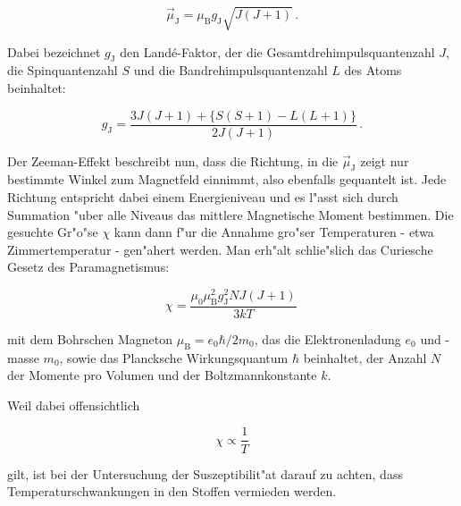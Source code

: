 		\begin{equation*}
			\vec{\mu}_\mathrm{J} = \mu_\mathrm{B} g_\mathrm{J} \sqrt{J(J + 1)}\,.
		\end{equation*}

		Dabei bezeichnet $g_\mathrm{J}$ den Land\'e-Faktor, der die Gesamtdrehimpulsquantenzahl $J$, die Spinquantenzahl $S$ und die Bandrehimpulsquantenzahl $L$ des Atoms beinhaltet:

		\begin{equation*}
			g_\mathrm{J} = \frac{3 J(J + 1) + \{S (S + 1) - L(L + 1)\}}{2J(J + 1)}\,.
		\end{equation*}

		Der Zeeman-Effekt beschreibt nun, dass die Richtung, in die $\vec{\mu}_\mathrm{J}$ zeigt nur bestimmte Winkel zum Magnetfeld einnimmt, also ebenfalls gequantelt ist.
		Jede Richtung entspricht dabei einem Energieniveau und es l"asst sich durch Summation "uber alle Niveaus das mittlere Magnetische Moment bestimmen.
		Die gesuchte Gr"o"se $\chi$ kann dann f"ur die Annahme gro"ser Temperaturen - etwa Zimmertemperatur -  gen"ahert werden.
		\clearpage
		Man erh"alt schlie"slich das Curiesche Gesetz des Paramagnetismus:

		\begin{equation}
			\label{curie}
			\chi = \frac{\mu_0 \mu_\mathrm{B}^2 g_\mathrm{J}^2 N J(J+1)}{3kT}\,
		\end{equation}

		mit dem Bohrschen Magneton $\mu_\mathrm{B} = e_0 \hbar / 2 m_0$, das die Elektronenladung $e_0$ und -masse $m_0$, sowie das Plancksche Wirkungsquantum $\hbar$ beinhaltet, der Anzahl $N$ der Momente pro Volumen und der Boltzmannkonstante $k$.

		Weil dabei offensichtlich

		\begin{equation*}
			\chi \propto \frac{1}{T}
		\end{equation*}

		gilt, ist bei der Untersuchung der Suszeptibilit"at darauf zu achten, dass Temperaturschwankungen in den Stoffen vermieden werden.